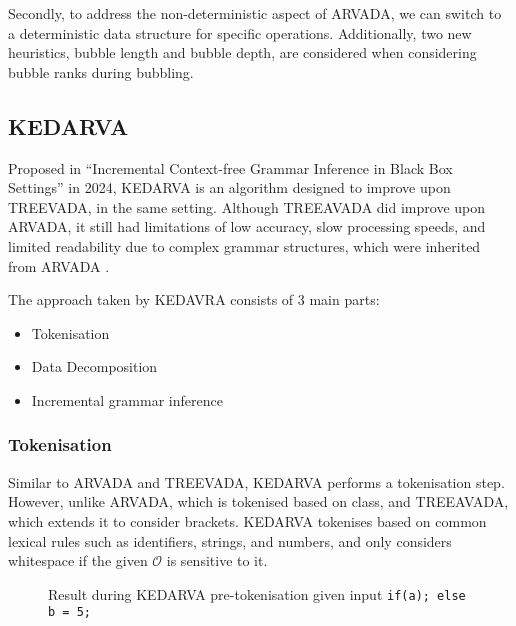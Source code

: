 Secondly, to address the non-deterministic aspect of ARVADA, we can switch to a deterministic data structure for specific operations. Additionally, two new heuristics, bubble length and bubble depth, are considered when considering bubble ranks during bubbling.

\subsection{KEDARVA}

Proposed in \enquote{Incremental Context-free Grammar Inference in Black Box
Settings} \cite{liIncrementalContextfreeGrammar2024} in 2024, KEDARVA is an algorithm designed to improve upon TREEVADA, in the same setting. Although TREEAVADA did improve upon ARVADA, it still had limitations of low accuracy, slow processing speeds, and limited readability due to complex grammar structures, which were inherited from ARVADA \cite{liIncrementalContextfreeGrammar2024,kulkarniLearningHighlyRecursive2021}. 

\vspace{\baselineskip}
The approach taken by KEDAVRA consists of 3 main parts:
\begin{itemize}
    \item Tokenisation
    \item Data Decomposition
    \item Incremental grammar inference
\end{itemize}

\subsubsection{Tokenisation}
Similar to ARVADA and TREEVADA, KEDARVA performs a tokenisation step. However, unlike ARVADA, which is tokenised based on class, and TREEAVADA, which extends it to consider brackets. KEDARVA tokenises based on common lexical rules such as identifiers, strings, and numbers, and only considers whitespace if the given $\mathcal{O}$ is sensitive to it. 

\begin{figure}[h!]
\centering
{}
\caption{Result during KEDARVA pre-tokenisation given input \texttt{if(a); else b = 5;}}
\label{fig:pre-tokenising KEDARVA}
\end{figure}


